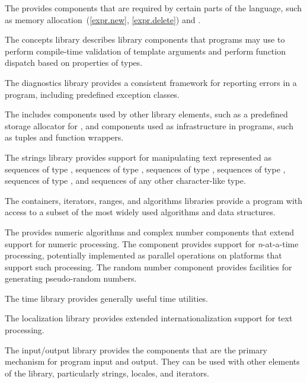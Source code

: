 \pnum
The  provides components that are
required by certain parts of the \Cpp{} language, such as memory allocation~(\ref{expr.new},
\ref{expr.delete}) and .

\pnum
The concepts library describes library components that \Cpp{}
programs may use to perform compile-time validation of template arguments and
perform function dispatch based on properties of types.

\pnum
The diagnostics library provides a consistent framework for
reporting errors in a \Cpp{} program, including predefined exception classes.

\pnum
The  includes components used
by other library elements, such as a predefined storage allocator for , and components used
as infrastructure
in \Cpp{} programs,
such as tuples and function wrappers.

\pnum
The strings library provides support for manipulating text represented
as sequences of type ,
sequences of type ,
sequences of type ,
sequences of type ,
sequences of type ,
and sequences of any other character-like type.

\pnum
The containers, iterators, ranges,
and algorithms libraries provide a \Cpp{} program with access
to a subset of the most widely used algorithms and data structures.

\pnum
The  provides
numeric algorithms and complex number components that extend support for numeric processing.
The
component provides support for
\textit{n}-at-a-time
processing,
potentially implemented as parallel operations on platforms that support such processing.
The random number component provides facilities for generating pseudo-random numbers.

\pnum
The time library provides
generally useful time utilities.

\pnum
The localization library provides extended internationalization
support for text processing.

\pnum
The input/output library provides the
components that are the primary mechanism for \Cpp{} program input and output.
They can be used with other elements of the library, particularly
strings, locales, and iterators.

